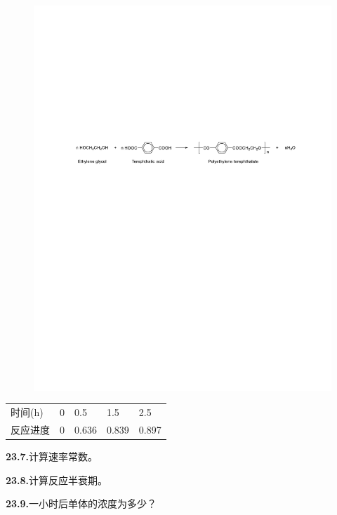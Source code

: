 \begin{figure}[h]
	\centering
	\includegraphics[width=15cm]{./pic/t23-1.pdf}
\end{figure}

\begin{longtable}[]{@{}lllll@{}}
\toprule
时间(h) &0&0.5&1.5&2.5 \tabularnewline
反应进度 & 0&0.636&0.839&0.897\tabularnewline
\bottomrule
\end{longtable}

\noindent\textbf{23.7.}计算速率常数。

\noindent\textbf{23.8.}计算反应半衰期。

\noindent\textbf{23.9.}一小时后单体的浓度为多少？
